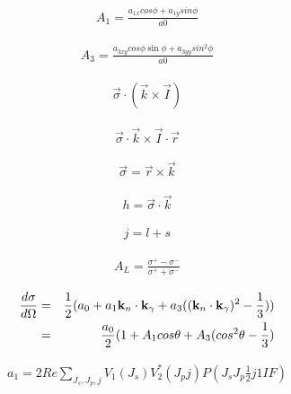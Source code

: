 \documentclass[11pt,a4paper]{jsarticle}
\begin{document}
\begin{eqnarray}
A_1=\frac{a_{1x}cos\phi+a_{1y}sin\phi}{a0}
\end{eqnarray}

\begin{eqnarray}
A_3=\frac{a_{3xy}cos\phi\sin\phi+a_{3yy}sin^2\phi}{a0}
\end{eqnarray}



\begin{eqnarray}
\vec{\sigma}\cdot (\vec{k}\times \vec{I})
\end{eqnarray}

\begin{eqnarray}
\vec{\sigma}\cdot \vec{k}\times \vec{I}\cdot \vec{r}
\end{eqnarray}

\begin{eqnarray}
\vec{\sigma} = \vec{r} \times \vec{k}
\end{eqnarray}

\begin{eqnarray}
h = \vec{\sigma} \cdot \vec{k}
\end{eqnarray}

\begin{eqnarray}
{
j = l + s}
\end{eqnarray}





\begin{eqnarray}
A_L = \frac{\sigma^{+} - \sigma^{-}}{\sigma^{+} + \sigma^{-}}
\end{eqnarray}






\begin{eqnarray}
\frac{d\sigma}{d\Omega} 
&= & \frac{1}{2}(a_0+a_1{\bf k}_n\cdot {\bf k}_\gamma
+a_3(({\bf k}_n\cdot {\bf k}_\gamma)^2-\frac{1}{3}))   \nonumber \\
&= &\frac{a_0}{2}(1+A_1 cos\theta
+A_3(cos^2 \theta-\frac{1}{3})   \nonumber
\end{eqnarray}

\hspace{3cm}


\begin{eqnarray}
a_1=2 Re\sum_{J_s,J_p,j}^{ }  V_1(J_s)V_2^*(J_p j)P(J_s J_p \frac{1}{2}j 1 I F)
\end{eqnarray}
\end{document}
